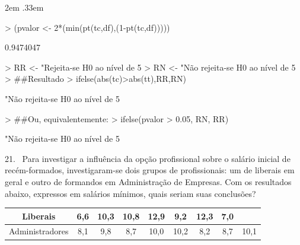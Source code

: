 \documentclass{article}
\newenvironment{ManualExercise}
  {\begin{list}{}{\leftmargin \QuestionIndent
    \partopsep0pt \parsep\parskip \topsep\QuestionBefore
    \itemsep\QuestionBefore \labelwidth2em
    \labelsep.33em
    \usecounter{Question}}}
  {\end{list}}
\begin{document}
\begin{Exercise}
\begin{ManualExercise}
\begin{Schunk}
\begin{Soutput}
\end{Soutput}
\begin{Sinput}
> (pvalor <- 2*(min(pt(tc,df),(1-pt(tc,df)))))
\end{Sinput}
\begin{Soutput}
[1] 0.9474047
\end{Soutput}
\begin{Sinput}
> RR <- "Rejeita-se H0 ao nível de 5%
> RN <- "Não rejeita-se H0 ao nível de 5%
> ##Resultado
> ifelse(abs(tc)>abs(tt),RR,RN)
\end{Sinput}
\begin{Soutput}
[1] "Não rejeita-se H0 ao nível de 5%
\end{Soutput}
\begin{Sinput}
> ##Ou, equivalentemente:
> ifelse(pvalor > 0.05, RN, RR)
\end{Sinput}
\begin{Soutput}
[1] "Não rejeita-se H0 ao nível de 5%
\end{Soutput}
\end{Schunk}

\item[21.~]Para investigar a influência da opção profissional sobre o salário inicial de recém-formados, investigaram-se dois grupos de profissionais: um de liberais em geral 
e outro de formandos em Administração de Empresas. Com os resultados abaixo, expressos em salários mínimos, quais seriam suas conclusões?

\begin{tabular}{ccccccccc}\\ \hline
Liberais & 6,6 & 10,3 & 10,8 & 12,9 & 9,2 & 12,3 & 7,0 &  \\ \hline
Administradores & 8,1 & 9,8 & 8,7 & 10,0 & 10,2 & 8,2 & 8,7 & 10,1 \\ \hline
\end{tabular}


\end{ManualExercise}
\end{Exercise}
\end{document}
